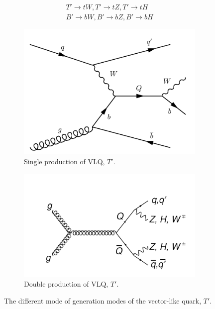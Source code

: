 \begin{equation*}\label{eq:label_1222}
\begin{split}
 T' \longrightarrow tW, T' \longrightarrow tZ, T' \longrightarrow tH  \\
   B' \longrightarrow bW, B' \longrightarrow bZ, B' \longrightarrow bH
\end{split}
\end{equation*}


\begin{figure}[H]
     \centering
     \begin{subfigure}[b]{0.47\textwidth}
         \centering
         \includegraphics[width=\textwidth]{figure_1/1.png}
         \caption{Single production of VLQ, $T'$.}
         \label{fig:yequalsx}
     \end{subfigure}
     \hfill
     \begin{subfigure}[b]{0.47\textwidth}
         \centering
         \includegraphics[width=\textwidth]{figure_1/2.png}
         \caption{Double production of VLQ, $T'$.}
         \label{fig:threesinx}
     \end{subfigure}
     \hfill
        \caption{The different mode of generation modes of the vector-like quark, $T'$.}
        \label{fig:threeVLQgraphs}
\end{figure}
